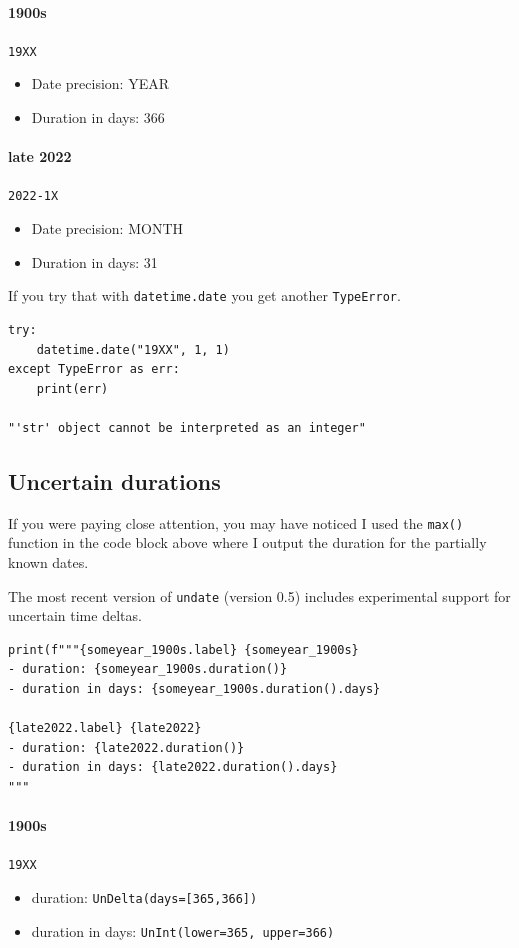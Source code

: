\documentclass{anthology-ch}         %
\begin{document}
\paragraph{1900s} \texttt{19XX}
\begin{itemize}
    \item Date precision: YEAR
    \item Duration in days: 366
\end{itemize}
    
\paragraph{late 2022} \texttt{2022-1X}
\begin{itemize}
    \item Date precision: MONTH
    \item Duration in days: 31
\end{itemize}    

    
If you try that with \texttt{datetime.date} you get another \texttt{TypeError}.    

\begin{verbatim}
try:
    datetime.date("19XX", 1, 1)
except TypeError as err:
    print(err)

"'str' object cannot be interpreted as an integer"
\end{verbatim}

\subsection{Uncertain durations}

If you were paying close attention, you may have noticed I used the
\texttt{max()} function in the code block above where I output the duration for the partially known dates.

The most recent version of \texttt{undate} (version 0.5) includes experimental support for 
uncertain time deltas.

\begin{verbatim}
print(f"""{someyear_1900s.label} {someyear_1900s}
- duration: {someyear_1900s.duration()}
- duration in days: {someyear_1900s.duration().days}

{late2022.label} {late2022}
- duration: {late2022.duration()}
- duration in days: {late2022.duration().days}
"""
\end{verbatim}

\paragraph{1900s} \texttt{19XX}
\begin{itemize}
    \item duration: \texttt{UnDelta(days=[365,366])}
    \item duration in days: \texttt{UnInt(lower=365, upper=366)}
\end{itemize}
\end{document}
